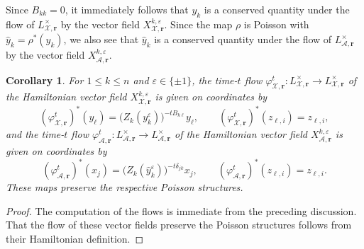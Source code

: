 \documentclass{amsart}
\newtheorem{corollary}[theorem]{Corollary}
\numberwithin{equation}{section}
\newcommand{\bfr}{{\boldsymbol{r}}}
\newcommand{\cA}{\mathcal{A}}
\newcommand{\cX}{\mathcal{X}}
\begin{document}
Since $B_{kk}=0$, it immediately follows that $y_k$ is a conserved quantity under the flow of $L^\times_{\cX,\bfr}$ by the vector field $X_{\cX,\bfr}^{k,\varepsilon}$.
Since the map $\rho$ is Poisson with $\hat y_k=\rho^*(y_k)$, we also see that $\hat y_k$ is a conserved quantity under the flow of $L^\times_{\cA,\bfr}$ by the vector field $X_{\cA,\bfr}^{k,\varepsilon}$.
\begin{corollary}
  \label{cor:time-one flows}
  For $1\le k\le n$ and $\varepsilon\in\{\pm1\}$, the time-$t$ flow $\varphi_{\cX,\bfr}^t:L^\times_{\cX,\bfr}\to L^\times_{\cX,\bfr}$ of the Hamiltonian vector field $X_{\cX,\bfr}^{k,\varepsilon}$ is given on coordinates by
  \[(\varphi_{\cX,\bfr}^t)^*(y_\ell)=\big(Z_k(y_k^\varepsilon)\big)^{-tB_{k\ell}}y_\ell,\qquad (\varphi_{\cX,\bfr}^t)^*(z_{\ell,i})=z_{\ell,i},\]
  and the time-$t$ flow $\varphi_{\cA,\bfr}^t:L^\times_{\cA,\bfr}\to L^\times_{\cA,\bfr}$ of the Hamiltonian vector field $X_{\cA,\bfr}^{k,\varepsilon}$ is given on coordinates by
  \[(\varphi_{\cA,\bfr}^t)^*(x_j)=\big(Z_k(\hat y_k^\varepsilon)\big)^{-t\delta_{jk}}x_j,\qquad (\varphi_{\cA,\bfr}^t)^*(z_{\ell,i})=z_{\ell,i}.\]
  These maps preserve the respective Poisson structures.
\end{corollary}
\begin{proof}
  The computation of the flows is immediate from the preceding discussion.
  That the flow of these vector fields preserve the Poisson structures follows from their Hamiltonian definition.
\end{proof}
\end{document}
